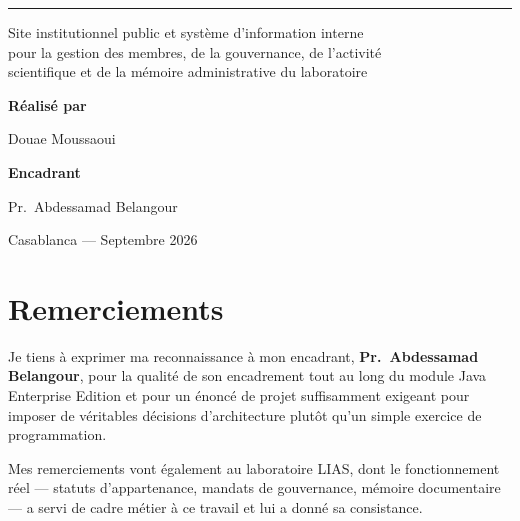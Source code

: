\begin{titlepage}
\vspace{7mm}
{\color{liasrule}\rule{\textwidth}{0.8pt}}

\vspace{14mm}
{\normalsize Site institutionnel public et système d'information interne\\
pour la gestion des membres, de la gouvernance, de l'activité\\
scientifique et de la mémoire administrative du laboratoire\par}

\vfill

\begin{minipage}{0.46\textwidth}
\raggedright
{\small\bfseries\color{liasgrey} Réalisé par\par}
\vspace{1mm}
{\normalsize Douae Moussaoui\par}
\end{minipage}
\hfill
\begin{minipage}{0.46\textwidth}
\raggedleft
{\small\bfseries\color{liasgrey} Encadrant\par}
\vspace{1mm}
{\normalsize Pr.~Abdessamad Belangour\par}
\end{minipage}

\vspace{12mm}
{\small\color{liasgrey} Casablanca --- Septembre 2026\par}

\end{titlepage}

\cleardoublepage
{}
\pagestyle{plain}

\chapter*{Remerciements}

Je tiens à exprimer ma reconnaissance à mon encadrant, \textbf{Pr.~Abdessamad Belangour},
pour la qualité de son encadrement tout au long du module Java Enterprise Edition et pour un
énoncé de projet suffisamment exigeant pour imposer de véritables décisions d'architecture
plutôt qu'un simple exercice de programmation.

Mes remerciements vont également au laboratoire LIAS, dont le fonctionnement réel ---
statuts d'appartenance, mandats de gouvernance, mémoire documentaire --- a servi de
cadre métier à ce travail et lui a donné sa consistance.


